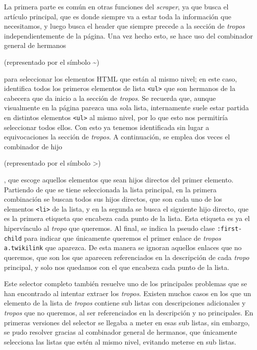 La primera parte es común en otras funciones del \textit{scraper}, ya que busca
el artículo principal, que es donde siempre va a estar toda la información que
necesitamos, y luego busca el header que siempre precede a la sección de
\textit{tropos} independientemente de la página. Una vez hecho esto, se hace uso
del combinador general de hermanos \cite{mozilla_selectores_2022}
\begin{otherlanguage}{english}(representado por el símbolo
\textasciitilde)\end{otherlanguage} para seleccionar los elementos HTML que
están al mismo nivel; en este caso, identifica todos los primeros elementos de
lista \texttt{<ul>} que son hermanos de la cabecera que da inicio a la sección
de \textit{tropos}. Se recuerda que, aunque visualmente en la página parezca una
sola lista, internamente suele estar partida en distintos elementos \texttt{<ul>} al 
mismo nivel, por lo que esto nos permitiría seleccionar todos ellos. Con esto ya
tenemos identificada sin lugar a equivocaciones la sección de \textit{tropos}. A
continuación, se emplea dos veces el combinador de hijo
\cite{mozilla_selectores_2022} \begin{otherlanguage}{english}(representado por
el símbolo \textgreater)\end{otherlanguage}, que escoge aquellos elementos que
sean hijos directos del primer elemento. Partiendo de que se tiene seleccionada
la lista principal, en la primera combinación se buscan todos sus hijos
directos, que son cada uno de los elementos \texttt{<li>} de la lista, y en la
segunda se busca el siguiente hijo directo, que es la primera etiqueta que
encabeza cada punto de la lista. Esta etiqueta es ya el hipervínculo al
\textit{tropo} que queremos. Al final, se indica la pseudo clase \texttt{:first-child} para 
indicar que únicamente queremos el primer enlace de \textit{tropos} \texttt{a.twikilink} que 
aparezca. De esta manera se ignoran aquellos enlaces que no queremos, que son
los que aparecen referenciados en la descripción de cada \textit{tropo}
principal, y solo nos quedamos con el que encabeza cada punto de la lista.

Este selector completo también resuelve uno de los principales problemas que se
han encontrado al intentar extraer los \textit{tropos}. Existen muchos casos en
los que un elemento de la lista de \textit{tropos} contiene sub listas con
descripciones adicionales y \textit{tropos} que no queremos, al ser
referenciados en la descripción y no principales. En primeras versiones del
selector se llegaba a meter en esas sub listas, sin embargo, se pudo resolver
gracias al combinador general de hermanos, que únicamente selecciona las listas
que estén al mismo nivel, evitando meterse en sub listas. 


